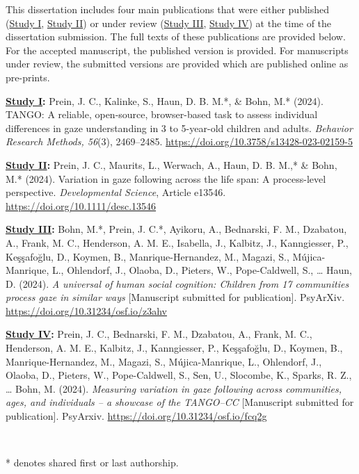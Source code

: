 \documentclass[
]{scrbook}
\begin{document}
This dissertation includes four main publications that were either published (\hyperref[studyI]{Study I}, \hyperref[studyII]{Study II}) or under review (\hyperref[studyIII]{Study III}, \hyperref[studyIV]{Study IV}) at the time of the dissertation submission. The full texts of these publications are provided below. For the accepted manuscript, the published version is provided. For manuscripts under review, the submitted versions are provided which are published online as pre-prints.

\textbf{\hyperref[studyI]{Study I}:} Prein, J. C., Kalinke, S., Haun, D. B. M.*, \& Bohn, M.* (2024). TANGO: A reliable, open-source, browser-based task to assess individual differences in gaze understanding in 3 to 5-year-old children and adults. \emph{Behavior Research Methods, 56}(3), 2469--2485. \mbox{\url{https://doi.org/10.3758/s13428-023-02159-5}}

\textbf{\hyperref[studyII]{Study II}:} Prein, J. C., Maurits, L., Werwach, A., Haun, D. B. M.,* \& Bohn, M.* (2024). Variation in gaze following across the life span: A process-level perspective. \emph{Developmental Science}, Article e13546. \mbox{\url{https://doi.org/10.1111/desc.13546}}

\textbf{\hyperref[studyIII]{Study III}:} Bohn, M.*, Prein, J. C.*, Ayikoru, A., Bednarski, F. M., Dzabatou, A., Frank, M. C., Henderson, A. M. E., Isabella, J., Kalbitz, J., Kanngiesser, P., Keşşafoğlu, D., Koymen, B., Manrique-Hernandez, M., Magazi, S., Mújica-Manrique, L., Ohlendorf, J., Olaoba, D., Pieters, W., Pope-Caldwell, S., \ldots{} Haun, D. (2024). \emph{A universal of human social cognition: Children from 17 communities process gaze in similar ways} {[}Manuscript submitted for publication{]}. PsyArXiv. \mbox{\url{https://doi.org/10.31234/osf.io/z3ahv}}

\textbf{\hyperref[studyIV]{Study IV}:} Prein, J. C., Bednarski, F. M., Dzabatou, A., Frank, M. C., Henderson, A. M. E., Kalbitz, J., Kanngiesser, P., Keşşafoğlu, D., Koymen, B., Manrique-Hernandez, M., Magazi, S., Mújica-Manrique, L., Ohlendorf, J., Olaoba, D., Pieters, W., Pope-Caldwell, S., Sen, U., Slocombe, K., Sparks, R. Z., \ldots{} Bohn, M. (2024). \emph{Measuring variation in gaze following across communities, ages, and individuals -- a showcase of the TANGO--CC} {[}Manuscript submitted for publication{]}. PsyArxiv. \mbox{\url{https://doi.org/10.31234/osf.io/fcq2g}}

~

* denotes shared first or last authorship.
\end{document}
